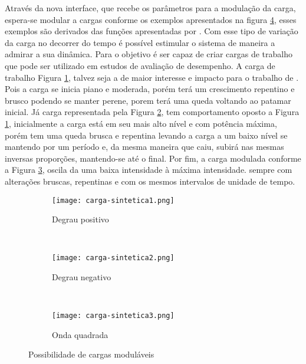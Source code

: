 Através da nova interface, que recebe os parâmetros para a modulação da carga, espera-se modular a cargas conforme os exemplos apresentados na figura	\ref{fig:cargas-moduladas-exemplos}, esses exemplos são derivados das funções apresentadas por . Com esse tipo de variação da carga no decorrer do tempo é possível estimular o sistema de maneira a admirar a sua dinâmica.  Para  o objetivo é ser capaz de criar cargas de trabalho que pode ser utilizado em estudos de avaliação de desempenho. 
A carga de trabalho Figura \ref{fig:degrau-positivo}, talvez seja a de maior interesse e impacto para o trabalho de . Pois a carga se inicia piano e moderada, porém terá um crescimento repentino e brusco podendo se manter perene, porem terá uma queda voltando ao patamar inicial. Já carga representada pela Figura \ref{fig:degrau-negativo}, tem comportamento oposto a Figura \ref{fig:degrau-positivo}, inicialmente a carga está em seu mais alto nível e com potência máxima, porém tem uma queda brusca e repentina levando a carga a um baixo nível se mantendo por um período e, da mesma maneira que caiu, subirá nas mesmas inversas proporções, mantendo-se até o final. Por fim, a carga modulada conforme a Figura \ref{fig:onda-gradrada}, oscila da uma baixa intensidade à máxima intensidade. sempre com alterações bruscas, repentinas e com os mesmos intervalos de unidade de tempo.
 
\begin{figure}[!htb]
	\centering
	\begin{subfigure}[b]{0.45\textwidth}
		\texttt{[image: carga-sintetica1.png]}
		\caption{Degrau positivo}
		\label{fig:degrau-positivo}
	\end{subfigure}
	~
	\begin{subfigure}[b]{0.45\textwidth}
		\texttt{[image: carga-sintetica2.png]}
		\caption{Degrau negativo}
		\label{fig:degrau-negativo}
	\end{subfigure}
	~
	\begin{subfigure}[b]{0.45\textwidth}
		\texttt{[image: carga-sintetica3.png]}
		\caption{Onda quadrada}
		\label{fig:onda-gradrada}
	\end{subfigure}
	\caption{Possibilidade de cargas moduláveis}
	\label{fig:cargas-moduladas-exemplos}
\end{figure}


